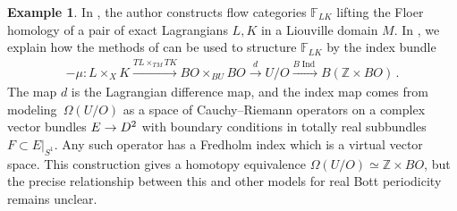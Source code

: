 \documentclass[10pt]{amsart}
\numberwithin{equation}{section}
\theoremstyle{definition}
\newtheorem{ex}[prop]{Example}
\DeclareMathOperator{\Ind}{Ind}
\newcommand{\bF}{\mathbb{F}}
\newcommand{\bZ}{\mathbb{Z}}
\renewcommand{\to}{\mathchoice{\longrightarrow}{\rightarrow}{}{}}
\begin{document}
\begin{ex}\label{ex:lagrangian_floer_htpy_type}
	In \cite{large2021spectral}, the author constructs flow categories $\bF_{LK}$ lifting the Floer homology of a pair of exact Lagrangians $L,K$ in a Liouville domain $M$.
  In , we explain how the methods of \cite{porcelli2024spectral} can be used to structure $\bF_{LK}$ by the index bundle
	\begin{align*}
		-\mu\colon L\times_{X}K \xrightarrow{TL\times_{TM} TK} BO\times_{BU} BO \xrightarrow{d} U/O \xrightarrow{B\Ind} B(\bZ\times BO) \,.
	\end{align*}
	The map $d$ is the Lagrangian difference map, and the index map comes from modeling~$\Omega (U/O)$ as a space of Cauchy--Riemann operators on a complex vector bundles $E\to D^{2}$ with boundary conditions in totally real subbundles $F\subset E\vert_{S^{1}}$.
  Any such operator has a Fredholm index which is a virtual vector space.
  This construction gives a homotopy equivalence $\Omega(U/O) \simeq \bZ\times BO$, but the precise relationship between this and other models for real Bott periodicity remains unclear.


\end{ex}
\end{document}
